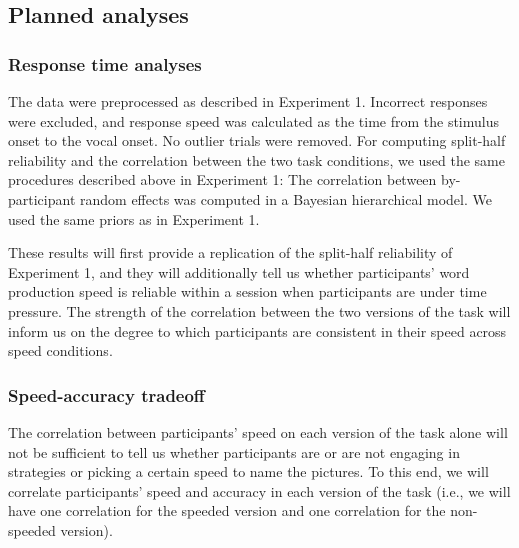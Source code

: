 \documentclass[
  man,floatsintext]{apa6}
\begin{document}
\hypertarget{planned-analyses-1}{%
\subsection{Planned analyses}\label{planned-analyses-1}}

\hypertarget{response-time-analyses}{%
\subsubsection{Response time analyses}\label{response-time-analyses}}

The data were preprocessed as described in Experiment 1. Incorrect responses were excluded, and response speed was calculated as the time from the stimulus onset to the vocal onset. No outlier trials were removed. For computing split-half reliability and the correlation between the two task conditions, we used the same procedures described above in Experiment 1: The correlation between by-participant random effects was computed in a Bayesian hierarchical model. We used the same priors as in Experiment 1.

These results will first provide a replication of the split-half reliability of Experiment 1, and they will additionally tell us whether participants' word production speed is reliable within a session when participants are under time pressure. The strength of the correlation between the two versions of the task will inform us on the degree to which participants are consistent in their speed across speed conditions.

\hypertarget{speed-accuracy-tradeoff}{%
\subsubsection{Speed-accuracy tradeoff}\label{speed-accuracy-tradeoff}}

The correlation between participants' speed on each version of the task alone will not be sufficient to tell us whether participants are or are not engaging in strategies or picking a certain speed to name the pictures. To this end, we will correlate participants' speed and accuracy in each version of the task (i.e., we will have one correlation for the speeded version and one correlation for the non-speeded version).
\end{document}
